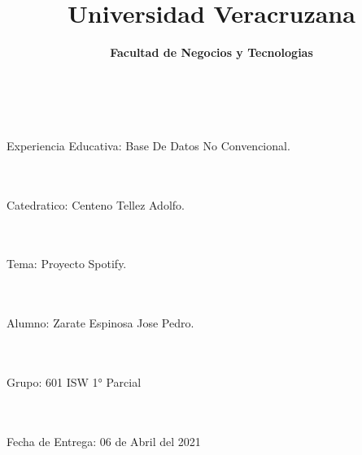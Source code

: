 \documentclass[40pt]{article}
\title{\textbf{Universidad Veracruzana} }
\date{\textbf{Facultad de Negocios y Tecnologias} }
\begin{document}
\maketitle
\textsf{\Large 
\\
\\
Experiencia Educativa: Base De Datos No Convencional. \\}
\\
\\ 
\maketitle
\textsf{\Large Catedratico: Centeno Tellez Adolfo. \\}
\\
\\
\maketitle
\textsf{\Large Tema: Proyecto Spotify. \\}
\\
\\
\maketitle
\textsf{\Large Alumno: Zarate Espinosa Jose Pedro. \\}
\\
\\ 
\maketitle
\textsf{\Large Grupo: 601 ISW 1° Parcial \\}
\\
\\
\maketitle
\textsf{\Large Fecha de Entrega: 06 de Abril del 2021 \\}
\end{document}
